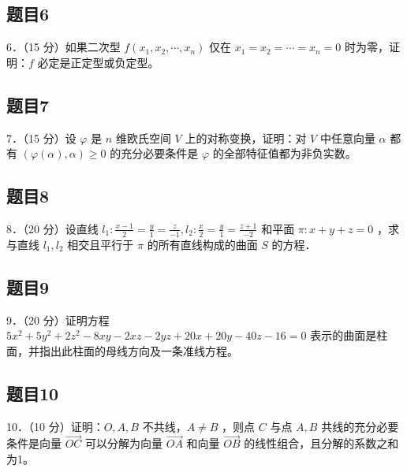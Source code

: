 \documentclass{article}
\begin{document}
\subsection{题目6}
6．（15 分）如果二次型 \(f\left(x_{1}, x_{2}, \cdots, x_{n}\right)\) 仅在 \(x_{1}=x_{2}=\cdots=x_{n}=0\) 时为零，证明：\(f\) 必定是正定型或负定型。

\subsection{题目7}
7．（15 分）设 \(\varphi\) 是 \(n\) 维欧氏空间 \(V\) 上的对称变换，证明：对 \(V\) 中任意向量 \(\alpha\) 都有 \((\varphi(\alpha), \alpha) \geq 0\) 的充分必要条件是 \(\varphi\) 的全部特征值都为非负实数。

\subsection{题目8}
8．（20 分）设直线 \(l_{1}: \frac{x-1}{2}=\frac{y}{1}=\frac{z}{-1}, l_{2}: \frac{x}{2}=\frac{y}{1}=\frac{z+1}{-2}\) 和平面 \(\pi: x+y+z=0\) ，求与直线 \(l_{1}, l_{2}\) 相交且平行于 \(\pi\) 的所有直线构成的曲面 \(S\) 的方程．

\subsection{题目9}
9．（20 分）证明方程 \(5 x^{2}+5 y^{2}+2 z^{2}-8 x y-2 x z-2 y z+20 x+20 y-40 z-16=0\) 表示的曲面是柱面，并指出此柱面的母线方向及一条准线方程。

\subsection{题目10}
10．（10 分）证明：\(O, A, B\) 不共线，\(A \neq B\) ，则点 \(C\) 与点 \(A, B\) 共线的充分必要条件是向量 \(\overrightarrow{O C}\) 可以分解为向量 \(\overrightarrow{O A}\) 和向量 \(\overrightarrow{O B}\) 的线性组合，且分解的系数之和为1。
\end{document}
